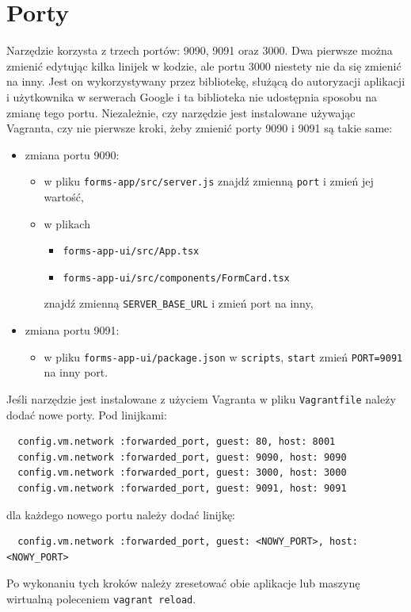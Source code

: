 \section{Porty}
Narzędzie korzysta z trzech portów: 9090, 9091 oraz 3000. Dwa pierwsze można
zmienić edytując kilka linijek w kodzie, ale portu 3000 niestety nie da się zmienić
na inny. Jest on wykorzystywany przez bibliotekę, służącą do autoryzacji aplikacji
i użytkownika w serwerach Google i ta biblioteka nie udostępnia sposobu 
na zmianę tego portu. Niezależnie, czy narzędzie jest instalowane używając Vagranta,
czy nie pierwsze kroki, żeby zmienić porty 9090 i 9091 są takie same:
\begin{itemize}
  \item zmiana portu 9090: 
    \begin{itemize}
      \item w pliku \texttt{forms-app/src/server.js} znajdź zmienną
        \texttt{port} i zmień jej wartość,
      \item w plikach
        \begin{itemize}
          \item \texttt{forms-app-ui/src/App.tsx}
          \item \texttt{forms-app-ui/src/components/FormCard.tsx}
        \end{itemize}
        znajdź zmienną \texttt{SERVER\_BASE\_URL} i zmień port na inny,
    \end{itemize}
  \item zmiana portu 9091:
    \begin{itemize}
      \item w pliku \texttt{forms-app-ui/package.json} w \texttt{scripts}, 
            \texttt{start} zmień \texttt{PORT=9091} na inny port.
    \end{itemize}
\end{itemize}

Jeśli narzędzie jest instalowane z użyciem Vagranta w pliku \texttt{Vagrantfile}
należy dodać nowe porty. Pod linijkami:
\begin{verbatim}
  config.vm.network :forwarded_port, guest: 80, host: 8001
  config.vm.network :forwarded_port, guest: 9090, host: 9090
  config.vm.network :forwarded_port, guest: 3000, host: 3000
  config.vm.network :forwarded_port, guest: 9091, host: 9091
\end{verbatim}
dla każdego nowego portu należy dodać linijkę:
\begin{verbatim}
  config.vm.network :forwarded_port, guest: <NOWY_PORT>, host: <NOWY_PORT>
\end{verbatim}
Po wykonaniu tych kroków należy zresetować obie aplikacje lub maszynę wirtualną
poleceniem \texttt{vagrant reload}.

